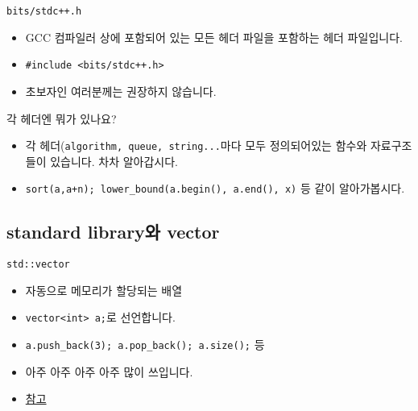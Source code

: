 \begin{frame}{\textbf{\currentname}}
    \begin{block}{\texttt{bits/stdc++.h}}
        \begin{itemize}
            \item GCC 컴파일러 상에 포함되어 있는 모든 헤더 파일을 포함하는 헤더 파일입니다.
            \item \texttt{\#include <bits/stdc++.h>} 
            \item 초보자인 여러분께는 권장하지 않습니다.
        \end{itemize}
    \end{block}

    \begin{block}{각 헤더엔 뭐가 있나요?}
        \begin{itemize}
            \item 각 헤더(\texttt{algorithm, queue, string...}마다 모두 정의되어있는 함수와 자료구조들이 있습니다. 차차 알아갑시다.
            \item \texttt{sort(a,a+n); lower\_bound(a.begin(), a.end(), x)} 등 같이 알아가봅시다.
        \end{itemize}
    \end{block}
\end{frame}

\subsection{standard library와 vector}
\begin{frame}{\textbf{\currentname}}
    \begin{block}{\texttt{std::vector}}
        \begin{itemize}
            \item 자동으로 메모리가 할당되는 배열
            \item \texttt{vector<int> a;}로 선언합니다.
            \item \texttt{a.push\_back(3); a.pop\_back(); a.size();} 등
            \item 아주 아주 아주 아주 많이 쓰입니다.
            \item \href{https://blockdmask.tistory.com/70}{참고}
        \end{itemize}
    \end{block}
\end{frame}

